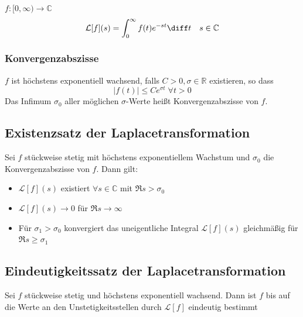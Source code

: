 \begin{emphbox}
    $f:[0,\infty) \rightarrow \mathbb C$
    \begin{equation*}
        \mathcal L[f](s)=\int_0^\infty f(t)e^{-st}\diff t \quad s\in\mathbb C
    \end{equation*}
\end{emphbox}

\begin{sectionbox}
    \subsubsection{Konvergenzabszisse}
    $f$ ist höchstens exponentiell wachsend, falls $C>0, \sigma\in\mathbb R$ existieren, so dass
    \begin{equation*}
        |f(t)|\le Ce^{\sigma t} \; \forall t > 0
    \end{equation*}
    Das Infimum $\sigma_0$ aller möglichen $\sigma$-Werte heißt Konvergenzabszisse von $f$.

    \subsection{Existenzsatz der Laplacetransformation}
    Sei $f$ stückweise stetig mit höchstens exponentiellem Wachstum und $\sigma_0$ die Konvergenzabszisse von $f$. Dann gilt:
    \begin{itemize}
        \item $\mathcal L[f](s)$ existiert $\forall s \in\mathbb C$ mit $\Re{s} > \sigma_0$
        \item $\mathcal L[f](s) \rightarrow 0$ für $\Re{s}\rightarrow \infty$
        \item Für $\sigma_1 > \sigma_0$ konvergiert das uneigentliche Integral $\mathcal L[f](s)$ gleichmäßig für $\Re{s}\ge \sigma_1$
    \end{itemize}

    \subsection{Eindeutigkeitssatz der Laplacetransformation}
    Sei $f$ stückweise stetig und höchstens exponentiell wachsend. Dann ist $f$ bis auf die Werte an den Unstetigkeitsstellen durch $\mathcal L[f]$ eindeutig bestimmt
\end{sectionbox}

